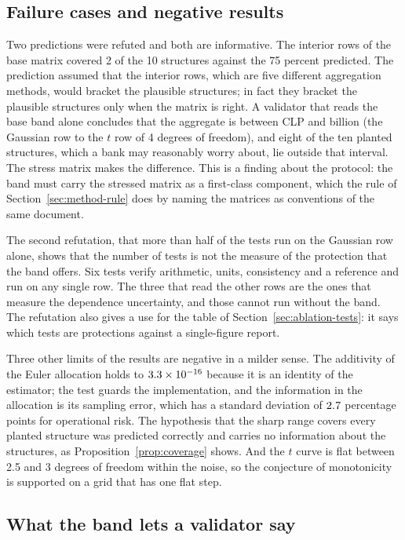 \subsection{Failure cases and negative results}
\label{sec:discussion-failures}

Two predictions were refuted and both are informative. The interior rows of the base matrix covered 2 of the 10 structures
against the 75 percent predicted. The prediction assumed that the interior rows, which are five different aggregation
methods, would bracket the plausible structures; in fact they bracket the plausible structures only when the matrix is right. A
validator that reads the base band alone concludes that the aggregate is between CLP \bdGauss{} and \bdTFour{} billion (the Gaussian
row to the $t$ row of 4 degrees of freedom), and eight of the ten planted structures, which a bank may
reasonably worry about, lie outside that interval. The stress matrix makes the difference. This is a finding about the protocol:
the band must carry the stressed matrix as a first-class component, which the rule of Section~\ref{sec:method-rule} does by naming
the matrices as conventions of the same document.

The second refutation, that more than half of the tests run on the Gaussian row alone, shows that the number of tests is not the
measure of the protection that the band offers. Six tests verify arithmetic, units, consistency and a reference and run on any
single row. The three that read the other rows are the ones that measure the dependence uncertainty, and those cannot run without the band.
The refutation also gives a use for the table of Section~\ref{sec:ablation-tests}: it says which tests are protections against a
single-figure report.

Three other limits of the results are negative in a milder sense. The additivity of the Euler allocation holds to
$3.3\times 10^{-16}$ because it is an identity of the estimator; the test guards the implementation, and the information in the allocation
is its sampling error, which has a standard deviation of $2.7$ percentage points for operational risk. The hypothesis that the sharp range
covers every planted structure was predicted correctly and carries no information about the structures, as
Proposition~\ref{prop:coverage} shows. And the $t$ curve is flat between 2.5 and 3 degrees of freedom within the noise, so the
conjecture of monotonicity is supported on a grid that has one flat step.

\subsection{What the band lets a validator say}
\label{sec:discussion-validator}

